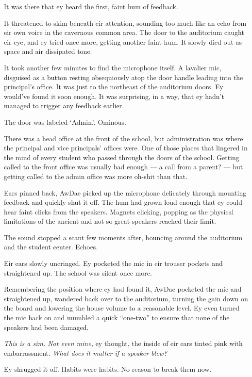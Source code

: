 It was there that ey heard the first, faint hum of feedback.

It threatened to skim beneath eir attention, sounding too much like an echo from eir own voice in the cavernous common area. The door to the auditorium caught eir eye, and ey tried once more, getting another faint hum. It slowly died out as space and air dissipated tone.

It took another few minutes to find the microphone itself. A lavalier mic, disguised as a button resting obsequiously atop the door handle leading into the principal's office. It was just to the northeast of the auditorium doors. Ey would've found it soon enough. It was surprising, in a way, that ey hadn't managed to trigger any feedback earlier.

The door was labeled `Admin.'. Ominous.

There was a head office at the front of the school, but administration was where the principal and vice principals' offices were. One of those places that lingered in the mind of every student who passed through the doors of the school. Getting called to the front office was usually bad enough — a call from a parent? — but getting called to the admin office was more oh-shit than that.

Ears pinned back, AwDae picked up the microphone delicately through mounting feedback and quickly shut it off. The hum had grown loud enough that ey could hear faint clicks from the speakers. Magnets clicking, popping as the physical limitations of the ancient-and-not-so-great speakers reached their limit.

The sound stopped a scant few moments after, bouncing around the auditorium and the student center. Echoes.

Eir ears slowly uncringed. Ey pocketed the mic in eir trouser pockets and straightened up. The school was silent once more.

Remembering the position where ey had found it, AwDae pocketed the mic and straightened up, wandered back over to the auditorium, turning the gain down on the board and lowering the house volume to a reasonable level. Ey even turned the mic back on and mumbled a quick ``one-two'' to ensure that none of the speakers had been damaged.

\emph{This is a sim. Not even mine,} ey thought, the inside of eir ears tinted pink with embarrassment. \emph{What does it matter if a speaker blew?}

Ey shrugged it off. Habits were habits. No reason to break them now.


